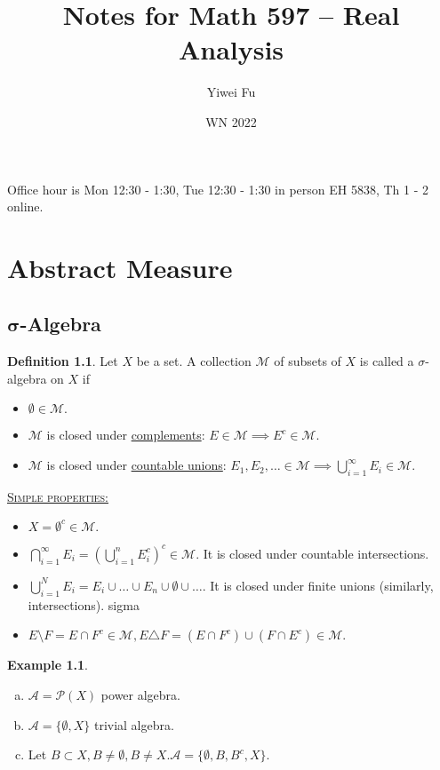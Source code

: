 \documentclass{report}
\newcommand{\fancyem}[1]{\underline{\textsc{#1}}}
\theoremstyle{definition}
\newtheorem{definition}[theorem]{Definition}
\newtheorem{example}[theorem]{Example}
\theoremstyle{remark}
\newcommand*\ttlmath[2]{\texorpdfstring{$\boldsymbol{#1}$}{#2}}
\begin{document}
\clearpage
\thispagestyle{empty}
\title{Notes for Math 597 -- Real Analysis}
\author{Yiwei Fu}
\date{WN 2022}
\maketitle

\tableofcontents
Office hour is Mon 12:30 - 1:30, Tue 12:30 - 1:30 in person EH 5838, Th 1 - 2 online.

\clearpage
{}
\chapter{Abstract Measure}

\section{\ttlmath{\sigma}{sigma}-Algebra}
\begin{definition}
Let $X$ be a set. A collection $\mathcal{M}$ of subsets of $X$ is called a $\sigma$-algebra on $X$ if
\begin{itemize}
\item
	$\emptyset \in \mathcal{M}.$
\item
	$\mathcal{M}$ is closed under \underline{complements}: $E \in \mathcal{M} \implies E^c \in \mathcal{M}.$
\item
	$\mathcal{M}$ is closed under \underline{countable unions}: $E_1, E_2, \ldots \in \mathcal{M} \implies \bigcup_{i=1}^\infty E_i \in \mathcal{M}.$
\end{itemize}
\end{definition}
\fancyem{Simple properties:}
\begin{itemize}
\item
	$X = \emptyset^c \in \mathcal{M}.$
\item
	$\bigcap_{i=1}^\infty E_i = \left(\bigcup_{i=1}^n E_i^c\right)^c \in \mathcal{M}.$ It is closed under countable intersections.
\item
	$\bigcup_{i=1}^N E_i = E_i \cup \ldots \cup E_n \cup \emptyset \cup \ldots.$ It is closed under finite unions (similarly, intersections).
sigma\item
	$E \setminus F = E \cap F^c \in \mathcal{M}, E \triangle F = (E \cap F^c) \cup (F \cap E^c) \in \mathcal{M}.$
\end{itemize}

\begin{example}
\begin{enumerate}[(a)]
\item $\mathcal{A} = \mathcal{P}(X)$ power algebra.
\item $\mathcal{A} = \{\emptyset, X\}$ trivial algebra.
\item Let $B \subset X, B \neq \emptyset, B \neq X. \mathcal{A} = \{\emptyset, B, B^c, X\}.$
\end{enumerate}
\end{example}
\end{document}
